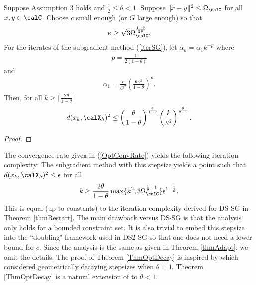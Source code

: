 \documentclass[smallextended]{svjour3}
\begin{document}
\begin{theorem}\label{OptimalP}\label{ThmOptDecay}
Suppose Assumption 3 holds and $\frac{1}{2}\leq \theta< 1$. Suppose $\|x-y\|^2\leq\Omega_{\calC}$ for all $x,y\in\calC$. 
Choose $c$ small enough (or $G$ large enough) so that 
\begin{eqnarray}
\kappa\label{kappaCond}
\geq
\sqrt{3}\Omega_{\calC}^{\frac{1-\theta}{2\theta}}.
\end{eqnarray}
For the iterates of the subgradient method (\ref{iterSG}), let $\alpha_k = \alpha_1 k^{-p}$ where
\begin{eqnarray}\label{defp}
p = \frac{1}{2(1-\theta)}
\end{eqnarray}
and 
\begin{eqnarray}\label{alph1Choice}
\alpha_1 = \frac{c}{G^2}\left(\frac{\theta\kappa^2}{1-\theta}\right)^p.
\end{eqnarray}
Then, for all $k\geq \lceil\frac{2\theta}{1-\theta}\rceil$
\begin{eqnarray}\label{OptConvRate}
d(x_k,\calX_h)^2 \leq  \left(
\frac{\theta }{1-\theta}
\right)^{\frac{\theta}{1-\theta}} \left(\frac{k}{\kappa^2}\right)^{\frac{\theta}{\theta-1}}.
\end{eqnarray}
\end{theorem}
\begin{proof} 

\end{proof} 

The convergence rate given in (\ref{OptConvRate}) yields the following iteration complexity: The subgradient method with this stepsize yields a point such that $d(x_k,\calX_h)^2\leq\epsilon$ for all
\begin{eqnarray*}
k\geq \frac{2\theta}{1-\theta} \max\{\kappa^2,3\Omega_{\calC}^{\frac{1}{\theta}-1}\} \epsilon^{1-\frac{1}{\theta}}.
\end{eqnarray*}
This is equal (up to constants) to the iteration complexity derived for DS-SG in Theorem \ref{thmRestart}. The main drawback versus DS-SG is that the analysis only holds for a bounded constraint set. It is also trivial to embed this stepsize into the ``doubling" framework used in DS2-SG so that one does not need a lower bound for $c$. Since the analysis is the same as given in Theorem \ref{thmAdapt}, we omit the details. The proof of Theorem \ref{ThmOptDecay} is inspired by \cite{goffin1977convergence} which considered geometrically decaying stepsizes when $\theta=1$. Theorem \ref{ThmOptDecay} is a natural extension of \cite{goffin1977convergence} to $\theta<1$. 
\end{document}
